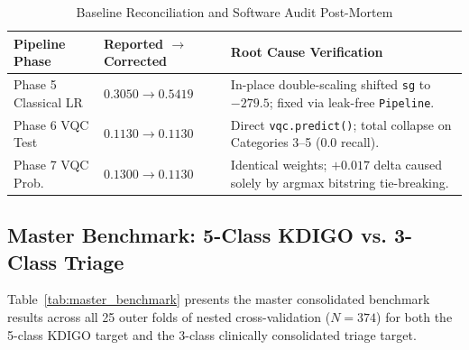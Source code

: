 \documentclass[conference]{IEEEtran}
\begin{document}
\begin{table}[htbp]
\centering
\caption{Baseline Reconciliation and Software Audit Post-Mortem}
\label{tab:bug_reconciliation}
\renewcommand{\arraystretch}{0.95}
\begin{tabularx}{\columnwidth}{lXX}
\toprule
\textbf{Pipeline Phase} & \textbf{Reported $\to$ Corrected} & \textbf{Root Cause Verification} \\
\midrule
Phase 5 Classical LR & $0.3050 \to \mathbf{0.5419}$ & In-place double-scaling shifted \texttt{sg} to $-279.5$; fixed via leak-free \texttt{Pipeline}. \\
Phase 6 VQC Test & $0.1130 \to \mathbf{0.1130}$ & Direct \texttt{vqc.predict()}; total collapse on Categories 3--5 (0.0 recall). \\
Phase 7 VQC Prob. & $0.1300 \to \mathbf{0.1130}$ & Identical weights; $+0.017$ delta caused solely by argmax bitstring tie-breaking. \\
\bottomrule
\end{tabularx}
\end{table}

\subsection{Master Benchmark: 5-Class KDIGO vs. 3-Class Triage}
Table~\ref{tab:master_benchmark} presents the master consolidated benchmark results across all 25 outer folds of nested cross-validation ($N = 374$) for both the 5-class KDIGO target and the 3-class clinically consolidated triage target.
\end{document}
